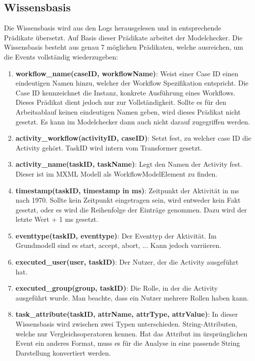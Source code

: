 \subsection{Wissensbasis}
Die Wissensbasis wird aus den Logs herausgelesen und in entsprechende Prädikate übersetzt. Auf Basis dieser Prädikate arbeitet der Modelchecker. Die Wissensbasis besteht aus genau 7 möglichen Prädikaten, welche ausreichen, um die Events vollständig wiederzugeben:\\

\begin{enumerate}
\item \textbf{workflow{\_}name(caseID, workflowName)}: Weist einer Case ID einen eindeutigen Namen hinzu, welcher der Workflow Spezifikation entspricht. Die Case ID kennzeichnet die Instanz, konkrete Ausführung eines Workflows. Dieses Prädikat dient jedoch nur zur Vollständigkeit. Sollte es für den Arbeitsablauf keinen eindeutigen Namen geben, wird dieses Prädikat nicht gesetzt. Es kann im Modelchecker dann auch nicht darauf zugegriffen werden.
\item \textbf{activity{\_}workflow(activityID, caseID)}: Setzt fest, zu welcher case ID die Activity gehört. TaskID wird intern vom Transformer gesetzt.
\item \textbf{activity{\_}name(taskID, taskName)}: Legt den Namen der Activity fest. Dieser ist im MXML Modell als WorkflowModelElement zu finden.
\item \textbf{timestamp(taskID, timestamp in ms)}: Zeitpunkt der Aktivität in ms nach 1970. Sollte kein Zeitpunkt eingetragen sein, wird entweder kein Fakt gesetzt, oder es wird die Reihenfolge der Einträge genommen. Dazu wird der letzte Wert + 1 ms gesetzt.
\item \textbf{eventtype(taskID, eventtype)}: Der Eventtyp der Aktivität. Im Grundmodell sind es start, accept, abort, ... Kann jedoch varriieren.
\item \textbf{executed{\_}user(user, taskID)}: Der Nutzer, der die Activity ausgeführt hat.
\item \textbf{executed{\_}group(group, taskID)}: Die Rolle, in der die Activity ausgeführt wurde. Man beachte, dass ein Nutzer mehrere Rollen haben kann.
\item \textbf{task{\_}attribute(taskID, attrName, attrType, attrValue)}: In dieser Wissensbasis wird zwischen zwei Typen unterschieden. String-Attributen, welche nur Vergleichsoperatoren kennen. Hat das Attribut im ürsprünglichen Event ein anderes Format, muss es für die Analyse in eine passende String Darstellung konvertiert werden. 
\end{enumerate}

